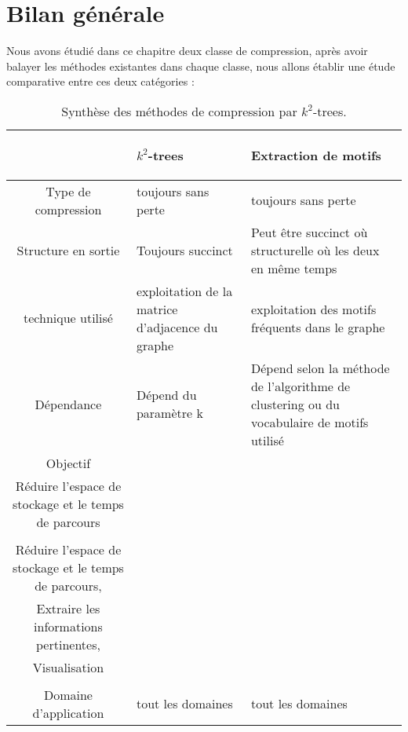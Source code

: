 \section{Bilan générale}
Nous avons étudié dans ce chapitre deux classe de compression, après avoir balayer les méthodes existantes dans chaque classe, nous allons établir une étude comparative entre ces deux catégories :
 
\begin{table}[H]
\begin{tabular}{|c|p{6cm}|p{6cm}|}

\hline & \begin{center}
\textbf{$k^2$-trees}
\end{center}     &  \begin{center} \textbf{Extraction de motifs} \end{center}  \\
										
										
\hline Type de compression & toujours sans perte & toujours sans perte \\
\hline Structure en sortie & Toujours succinct & Peut être succinct où structurelle où les deux en même temps\\

\hline technique utilisé & exploitation de la matrice d'adjacence du graphe & exploitation des motifs fréquents dans le graphe\\

\hline Dépendance & Dépend du paramètre k & Dépend selon la méthode de l'algorithme de clustering ou du vocabulaire de motifs utilisé  \\

\hline Objectif & 
\begin{minipage}[t]{0.35\textwidth}
  			Compression,\\
  			Réduire l'espace de stockage et le temps de parcours\\
  \end{minipage}
  &
  \begin{minipage}[t]{0.35\textwidth}
  			Compression,\\
  			Réduire l'espace de stockage et le temps de parcours,\\
  			Extraire les informations pertinentes, \\
  			Visualisation \\
  \end{minipage}
  \\
  \hline Domaine d'application & tout les domaines & tout les domaines \\
  \hline
\end{tabular}
									\caption{Synthèse des méthodes de compression par $k^2$-trees.}									
									
								\end{table}
								
							


